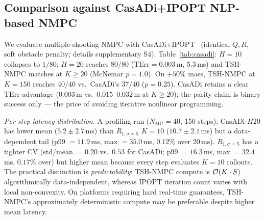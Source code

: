 \documentclass[11pt,onecolumn,a4paper]{article}
\newcommand{\Nm}{N_{\mathrm{MC}}}
\newcommand{\TErr}{\mathrm{TErr}}
\begin{document}
\subsection{Comparison against CasADi+IPOPT NLP-based NMPC}\label{sec:exp-casadi}

We evaluate multiple-shooting NMPC with CasADi+IPOPT~\cite{AND19,WAC06}
(identical $Q,R$, soft obstacle penalty; details supplementary S4).
Table~\ref{tab:casadi}: $H = 10$ collapses to $1/80$; $H = 20$ reaches
$80/80$ ($\TErr = 0.003\,$m, $5.3\,$ms) and TSH-NMPC matches at
$K \ge 20$ (McNemar $p = 1.0$). On $+50\%$ mass, TSH-NMPC at
$K = 150$ reaches $40/40$ vs.\ CasADi's $37/40$ ($p = 0.25$). CasADi
retains a clear $\TErr$ advantage ($0.003\,$m vs.\ $0.015$--$0.032\,$m
at $K \ge 20$); the parity claim is binary success only --- the price
of avoiding iterative nonlinear programming.

\emph{Per-step latency distribution.} A profiling run ($\Nm = 40$,
150 steps): CasADi-$H20$ has lower mean ($5.2 \pm 2.7\,$ms) than
$R_{1,\sigma=5}$ $K{=}10$ ($10.7 \pm 2.1\,$ms) but a data-dependent
tail (p99 $= 11.9\,$ms, max $= 35.0\,$ms, $0.12\%$ over $20\,$ms).
$R_{1,\sigma=5}$ has a tighter CV (std/mean $= 0.20$ vs.\ $0.53$ for
CasADi; p99 $= 16.3\,$ms, max $= 32.4\,$ms, $0.17\%$ over) but
higher mean because every step evaluates $K = 10$ rollouts. The
practical distinction is \emph{predictability}: TSH-NMPC compute is
${\cal O}(K \cdot S)$ algorithmically data-independent, whereas IPOPT
iteration count varies with local non-convexity. On platforms
requiring hard real-time guarantees, TSH-NMPC's approximately
deterministic compute may be preferable despite higher mean latency.
\end{document}
